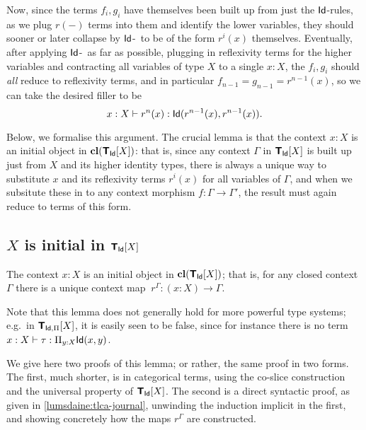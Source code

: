 \begin{center}\end{center}

Now, since the terms $f_i,g_i$ have themselves been built up from just the $\mathsf{Id}$-rules, as we plug $r(-)$ terms into them and identify the lower variables, they should sooner or later collapse by $\mathsf{Id}$-\comp\ to be of the form $r^i(x)$ themselves.  Eventually, after applying $\mathsf{Id}$-\elim\ as far as possible, plugging in reflexivity terms for the higher variables and contracting all variables of type $X$ to a single $x:X$, the $f_i, g_i$ should \emph{all} reduce to reflexivity terms, and in particular $f_{n-1} = g_{n-1} = r^{n-1}(x)$, so we can take the desired filler to be
$$x:X \vdash r^n(x) : \mathsf{Id}(r^{n-1}(x),r^{n-1}(x)).$$

Below, we formalise this argument.  The crucial lemma is that the context $x:X$ is an initial object in $\mathbf{cl}(\textbf{\textsf{T}}_{\mathsf{Id}}[X])$: that is, since any context $\Gamma$ in $\textbf{\textsf{T}}_{\mathsf{Id}}[X]$ is built up just from $X$ and its higher identity types, there is always a unique way to substitute $x$ and its reflexivity terms $r^i(x)$ for all variables of $\Gamma$, and when we subsitute these in to any context morphism $f \colon \Gamma \to \Gamma'$, the result must again reduce to terms of this form.

\subsection*{\texorpdfstring{$X$}{X} is initial in \texorpdfstring{$\textbf{\textsf{T}}_{\mathsf{Id}}[X]$}{ML\_Id[X]}} \label{subsec:initiality}

\begin{lemma} \label{lemma:initiality} The context $x:X$ is an initial object in $\mathbf{cl}(\textbf{\textsf{T}}_{\mathsf{Id}}[X])$; that is, for any closed context $\Gamma$ there is a unique context map $\ r^\Gamma \colon (x:X) \to \Gamma$. 
\end{lemma}

Note that this lemma does not generally hold for more powerful type systems; e.g.\ in $\textbf{\textsf{T}}_{\mathsf{Id},\Pi}[X]$, it is easily seen to be false, since for instance there is no term $x:X \vdash \tau : \Pi_{y:X} \mathsf{Id}(x,y)$.

We give here two proofs of this lemma; or rather, the same proof in two forms.  The first, much shorter, is in categorical terms, using the co-slice construction and the universal property of $\textbf{\textsf{T}}_{\mathsf{Id}}[X]$.  The second is a direct syntactic proof, as given in \ref{lumsdaine:tlca-journal}, unwinding the induction implicit in the first, and showing concretely how the maps $r^\Gamma$ are constructed.

